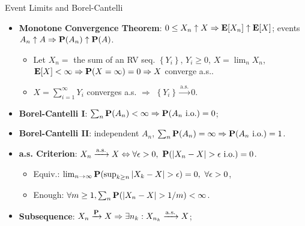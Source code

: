 \documentclass[landscape,a4paper]{article}
\begin{document}
\begin{cheatsheetcolumns}
\begin{card}{Event Limits and Borel-Cantelli}
\begin{itemize}
\begin{itemize}
					\item $\limsup A_n=\bigcap_{k\ge1}\bigcup_{n\ge k}A_n=\{A_n\text{ i.o.}\}$;
					\begin{itemize}
						\item ``infinite often''$=\forall N\ge 0, \exists n \ge N, A_n$ happens.
					\end{itemize}
					\item $\liminf A_n=\bigcup_{k\ge1}\bigcap_{n\ge k}A_n=\{A_n\text{ eventually}\}$.
					\begin{itemize}
						\item ``eventually''$=\exists N\ge 0, \forall n \ge N, A_n$ happens.
					\end{itemize}
					\item $\liminf A_n\subseteq\limsup A_n$; ``$=$'' $\Rightarrow\lim A_n$ exists. 
				\end{itemize}
				\item \textbf{Monotone Convergence Theorem}: $0\le X_n\uparrow X\Rightarrow\mathbf{E}[X_n]\uparrow\mathbf{E}[X]$; events $A_n\uparrow A\Rightarrow\mathbf{P}(A_n)\uparrow\mathbf{P}(A)$.
				\begin{itemize}
					\item Let $X_n=$ the sum of an RV seq. $\left\{Y_i\right\}$, $Y_i\ge 0$, $X=\lim_n X_n$,\\$\mathbf{E}[X]<\infty\Rightarrow\mathbf P(X=\infty)=0\Rightarrow X$ converge a.s..
					\item $X=\sum_{i=1}^\infty Y_i$ converges a.s. $\Rightarrow$ $\left\{Y_i\right\}\xrightarrow{\mathrm{a.s.}}0$.
				\end{itemize}
				\item \textbf{Borel-Cantelli I}: $\sum_n\mathbf{P}(A_n)<\infty\Rightarrow\mathbf{P}(A_n\text{ i.o.})=0$;
				\item \textbf{Borel-Cantelli II}: independent $A_n$, $\sum_n\mathbf{P}(A_n)=\infty\Rightarrow\mathbf{P}(A_n\text{ i.o.})=1$.
				\item \textbf{a.s. Criterion}: $X_n\xrightarrow{\mathrm{a.s.}}X\Leftrightarrow\forall\epsilon>0,\ \PP(|X_n-X|>\epsilon\text{ i.o.})=0$.
				\begin{itemize}
					\item Equiv.: $\lim_{n\to\infty}\PP(\sup_{k\ge n}|X_k-X|>\epsilon)=0,\ \forall\epsilon>0$,
					\item Enough: $\forall m\ge1,\sum_n\PP(|X_n-X|>1/m)<\infty$.
				\end{itemize}
				\item \textbf{Subsequence}: $X_n\xrightarrow{\mathbf{P}}X\Rightarrow\exists n_k:X_{n_k}\xrightarrow{\mathrm{a.s.}}X$; 

\end{itemize}
\end{card}
\end{cheatsheetcolumns}
\end{document}
